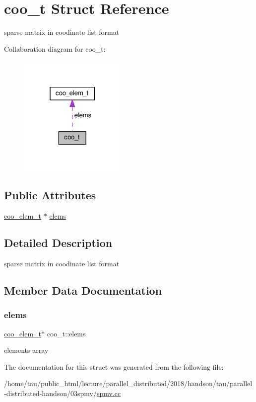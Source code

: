 \hypertarget{structcoo__t}{}\section{coo\+\_\+t Struct Reference}
\label{structcoo__t}


sparse matrix in coodinate list format  




Collaboration diagram for coo\+\_\+t\+:\nopagebreak
\begin{figure}[H]
\begin{center}
\leavevmode
\includegraphics[width=147pt]{structcoo__t__coll__graph}
\end{center}
\end{figure}
\subsection*{Public Attributes}
\begin{DoxyCompactItemize}
\item 
\hyperlink{structcoo__elem__t}{coo\+\_\+elem\+\_\+t} $\ast$ \hyperlink{structcoo__t_a3e74f1e3dadd34e5439f859fab277b54}{elems}
\end{DoxyCompactItemize}


\subsection{Detailed Description}
sparse matrix in coodinate list format 

\subsection{Member Data Documentation}
\mbox{\label{structcoo__t_a3e74f1e3dadd34e5439f859fab277b54}} 
\subsubsection{\texorpdfstring{elems}{elems}}
{\footnotesize\ttfamily \hyperlink{structcoo__elem__t}{coo\+\_\+elem\+\_\+t}$\ast$ coo\+\_\+t\+::elems}

elements array 

The documentation for this struct was generated from the following file\+:\begin{DoxyCompactItemize}
\item 
/home/tau/public\+\_\+html/lecture/parallel\+\_\+distributed/2018/handson/tau/parallel-\/distributed-\/handson/03spmv/\hyperlink{spmv_8cc}{spmv.\+cc}\end{DoxyCompactItemize}

